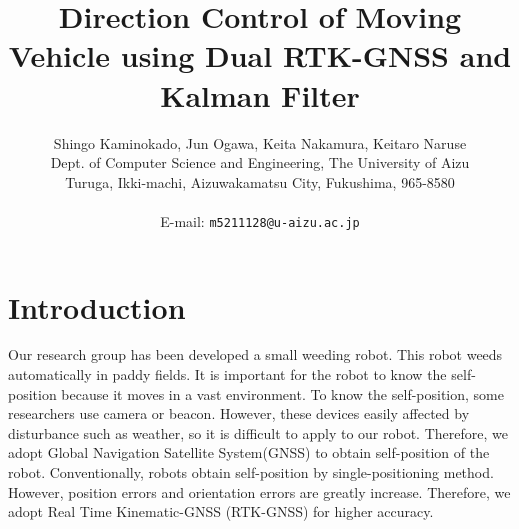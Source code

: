 \documentclass[a4paper]{article}
\begin{document}
\date{}
\title{\LARGE{\bf
Direction Control of Moving Vehicle using Dual RTK-GNSS and Kalman Filter}
}
\author{
Shingo Kaminokado, Jun Ogawa, Keita Nakamura, Keitaro Naruse \\
Dept. of Computer Science and Engineering, The University of Aizu\\
Turuga, Ikki-machi, Aizuwakamatsu City, Fukushima, 965-8580 \\
\\E-mail: \texttt{m5211128@u-aizu.ac.jp}
}

\maketitle
\thispagestyle{empty}


\section{Introduction}
Our research group has been developed a small weeding robot\cite{aigamo}. This robot weeds automatically in paddy fields.
It is important for the robot to know the self-position because it moves in a vast environment. To know the self-position, 
some researchers use camera\cite{camera-relate} or beacon\cite{beacon-relate}. 
However, these devices easily affected by disturbance such as weather, so it is difficult to apply to our robot.
Therefore, we adopt Global Navigation Satellite System(GNSS) to obtain self-position of the robot\cite{gnss}.
Conventionally, robots obtain self-position by single-positioning method.
However, position errors and orientation errors are greatly increase.
Therefore, we adopt Real Time Kinematic-GNSS (RTK-GNSS) for higher accuracy.
\end{document}
